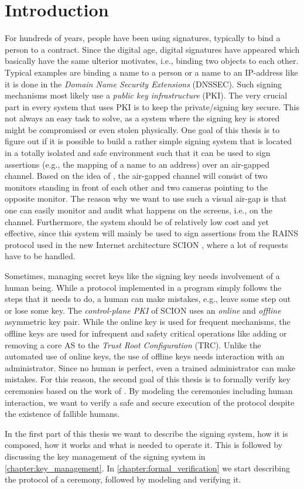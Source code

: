 \newcommand{\package}{\emph}

\chapter{Introduction}\label{chapter:intro}
For hundreds of years, people have been using signatures, typically to bind a person to a contract. Since the digital age, digital signatures have appeared which basically have the same ulterior motivates, i.e., binding two objects to each other. Typical examples are binding a name to a person or a name to an IP-address like it is done in the \emph{Domain Name Security Extensions} (DNSSEC). Such signing mechanisms most likely use a \emph{public key infrastructure} (PKI). The very crucial part in every system that uses PKI is to keep the private/signing key secure. This not always an easy task to solve, as a system where the signing key is stored might be compromised or even stolen physically. One goal of this thesis is to figure out if it is possible to build a rather simple signing system that is located in a totally isolated and safe environment such that it can be used to sign assertions (e.g., the mapping of a name to an address) over an air-gapped channel. Based on the idea of \citet{castle}, the air-gapped channel will consist of two monitors standing in front of each other and two cameras pointing to the opposite monitor. The reason why we want to use such a visual air-gap is that one can easily monitor and audit what happens on the screens, i.e., on the channel. Furthermore, the system should be of relatively low cost and yet effective, since this system will mainly be used to sign assertions from the RAINS protocol used in the new Internet architecture SCION \cite{scion_book}, where a lot of requests have to be handled.

Sometimes, managing secret keys like the signing key needs involvement of a human being. While a protocol implemented in a program simply follows the steps that it needs to do, a human can make mistakes, e.g., leave some step out or lose some key. The \emph{control-plane PKI} of SCION \cite{scion_book} uses an \emph{online} and \emph{offline} asymmetric key pair. While the online key is used for frequent mechanisms, the offline keys are used for infrequent and safety critical operations like adding or removing a core AS to the \emph{Trust Root Configuration} (TRC). Unlike the automated use of online keys, the use of offline keys needs interaction with an administrator. Since no human is perfect, even a trained administrator can make mistakes. For this reason, the second goal of this thesis is to formally verify key ceremonies based on the work of \citet{basin2016modeling}. By modeling the ceremonies including human interaction, we want to verify a safe and secure execution of the protocol despite the existence of fallible humans.

In the first part of this thesis we want to describe the signing system, how it is composed, how it works and what is needed to operate it. This is followed by discussing the key management of the signing system in \autoref{chapter:key_management}. In \autoref{chapter:formal_verification} we start describing the protocol of a ceremony, followed by modeling and verifying it.
